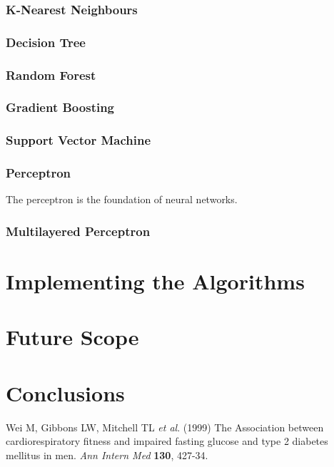 \documentclass[12pt]{article}
\begin{document}
\section{K-Nearest Neighbours}
\newpage
\section{Decision Tree}
\newpage
\section{Random Forest}
\newpage
\section{Gradient Boosting}
\newpage
\section{Support Vector Machine}
\newpage
\section{Perceptron}
The perceptron is the foundation of neural networks.
\newpage
\section{Multilayered Perceptron}
\newpage
\part{Implementing the Algorithms}
\newpage
\part{Future Scope}
\newpage
\part{Conclusions}
\clearpage

\newpage
\begin{thebibliography}{}

Wei M, Gibbons LW, Mitchell TL \textit{et al}. (1999) The Association between cardiorespiratory fitness and impaired fasting glucose and type 2 diabetes mellitus in men. \textit{Ann Intern Med} \textbf{130}, 427-34.

\end{thebibliography}
\end{document}
